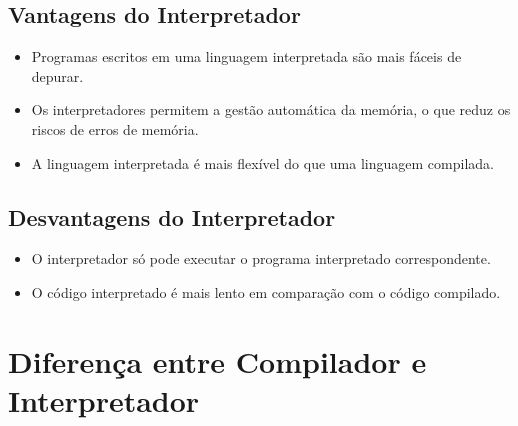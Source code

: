\documentclass[12pt,a4paper]{abntex2}
\begin{document}
\subsection{Vantagens do Interpretador}

\begin{itemize}
    \item Programas escritos em uma linguagem interpretada são mais fáceis de depurar.
    \item Os interpretadores permitem a gestão automática da memória, o que reduz os riscos de
    erros de memória.
    \item A linguagem interpretada é mais flexível do que uma linguagem compilada.
\end{itemize}

\subsection{Desvantagens do Interpretador}

\begin{itemize}
        \item O interpretador só pode executar o programa interpretado correspondente.
        \item O código interpretado é mais lento em comparação com o código compilado.
\end{itemize}



\section{\textbf{Diferença entre Compilador e Interpretador}}
\end{document}
